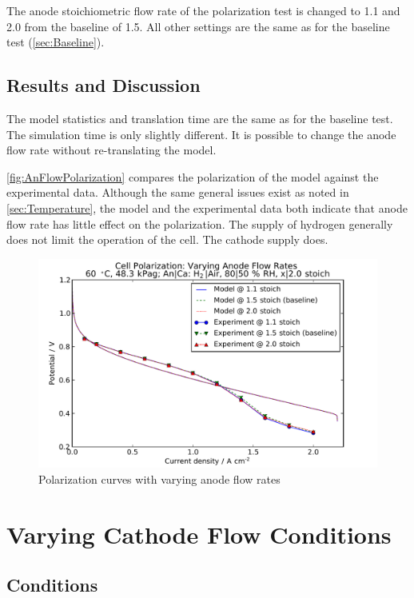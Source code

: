 The anode stoichiometric flow rate of the polarization test is changed to 1.1 and 2.0 from the 
baseline of 1.5.  All other settings are the same as for the baseline test (\autoref{sec:Baseline}).

\subsection{Results and Discussion}

The model statistics and translation time are the same as for the baseline test.  The simulation time is only slightly different.  It is possible to change the anode flow rate without re-translating the model.

\autoref{fig:AnFlowPolarization} compares the polarization of the model against the experimental data.  Although the same general issues exist as noted in \autoref{sec:Temperature}, the model and the experimental data both indicate that anode flow rate has little effect on the polarization.  The supply of hydrogen generally does not limit the operation of the cell.  The cathode supply does.

\begin{figure}[htbp]
  \includegraphics[width=\linewidth]{Results/Cell/Model/AnFlow/Polarization}%
  \caption{Polarization curves with varying anode flow rates}%
  \label{fig:AnFlowPolarization}
\end{figure}


\FloatBarrier %
\section{Varying Cathode Flow Conditions}

\subsection{Conditions}

